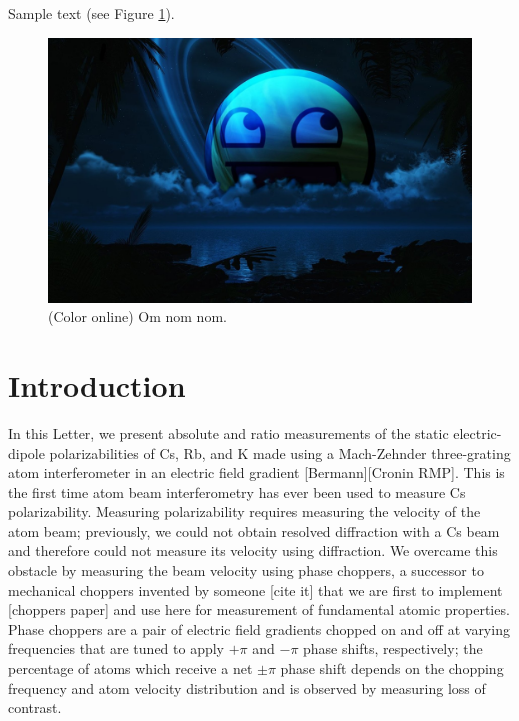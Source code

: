 \documentclass[twocolumn, prl,showpacs,superscriptaddress]{revtex4-1}   %
\begin{document}
Sample text (see Figure \ref{awesomeface})\cite{Hro14}.

\begin{figure}
\includegraphics[scale=0.15]{awesomeface_planet_wallpaper_2.jpg}
\caption{\label{awesomeface}(Color online) Om nom nom.}
\end{figure}





\section{Introduction}

In this Letter, we present absolute and ratio measurements of the static electric-dipole polarizabilities of Cs, Rb, and K made using a Mach-Zehnder three-grating atom interferometer in an electric field gradient [Bermann][Cronin RMP]. This is the first time atom beam interferometry has ever been used to measure Cs polarizability. Measuring polarizability requires measuring the velocity of the atom beam; previously, we could not obtain resolved diffraction with a Cs beam and therefore could not measure its velocity using diffraction. We overcame this obstacle by measuring the beam velocity using phase choppers, a successor to mechanical choppers invented by someone [cite it] that we are first to implement [choppers paper] and use here for measurement of fundamental atomic properties. Phase choppers are a pair of electric field gradients chopped on and off at varying frequencies that are tuned to apply $+\pi$ and $-\pi$ phase shifts, respectively; the percentage of atoms which receive a net $\pm\pi$ phase shift depends on the chopping frequency and atom velocity distribution and is observed by measuring loss of contrast. 
\end{document}
